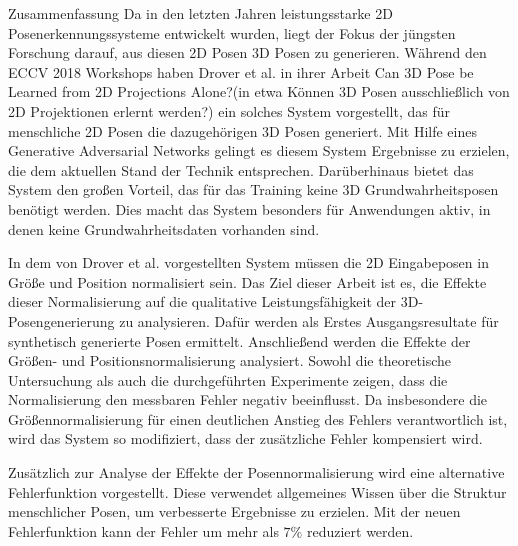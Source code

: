 \pagebreak
{}
\begin{polyabstract}{Zusammenfassung}
	Da in den letzten Jahren leistungsstarke 2D Posenerkennungssysteme entwickelt wurden, liegt der Fokus der jüngsten Forschung darauf, aus diesen 2D Posen 3D Posen zu generieren.
	Während den ECCV 2018 Workshops haben Drover et al. in ihrer Arbeit \glqq Can 3D Pose be Learned from 2D Projections Alone?\grqq (in etwa \glqq Können 3D Posen ausschließlich von 2D Projektionen erlernt werden?\grqq) ein solches System vorgestellt, das für menschliche 2D Posen die dazugehörigen 3D Posen generiert.
	Mit Hilfe eines Generative Adversarial Networks gelingt es diesem System Ergebnisse zu erzielen, die dem aktuellen Stand der Technik entsprechen.
	Darüberhinaus bietet das System den großen Vorteil, das für das Training keine 3D Grundwahrheitsposen benötigt werden.
	Dies macht das System besonders für Anwendungen aktiv, in denen keine Grundwahrheitsdaten vorhanden sind.
	
	In dem von Drover et al. vorgestellten System müssen die 2D Eingabeposen in Größe und Position normalisiert sein.
	Das Ziel dieser Arbeit ist es, die Effekte dieser Normalisierung auf die qualitative Leistungsfähigkeit der 3D-Posengenerierung zu analysieren.
	Dafür werden als Erstes Ausgangsresultate für synthetisch generierte Posen ermittelt.
	Anschließend werden die Effekte der Größen- und Positionsnormalisierung analysiert.
	Sowohl die theoretische Untersuchung als auch die durchgeführten Experimente zeigen, dass die Normalisierung den messbaren Fehler negativ beeinflusst.
	Da insbesondere die Größennormalisierung für einen deutlichen Anstieg des Fehlers verantwortlich ist, wird das System so modifiziert, dass der zusätzliche Fehler kompensiert wird.
	
	Zusätzlich zur Analyse der Effekte der Posennormalisierung wird eine alternative Fehlerfunktion vorgestellt.
	Diese verwendet allgemeines Wissen über die Struktur menschlicher Posen, um verbesserte Ergebnisse zu erzielen.
	Mit der neuen Fehlerfunktion kann der Fehler um mehr als $7\%$ reduziert werden. 
\end{polyabstract}

